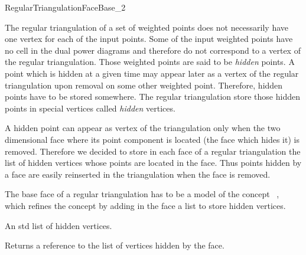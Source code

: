 

\begin{ccRefConcept}{RegularTriangulationFaceBase_2}


\ccDefinition
  
The regular triangulation of a set of weighted points does not
necessarily
have one vertex for each of the input points. Some of the input
weighted points have no cell in the dual power diagrams
and therefore do not correspond to a vertex of the regular
triangulation.
Those weighted points are said to be {\it hidden} points.
A  point which is hidden at a given time may appear later as a vertex of
the regular triangulation upon removal on some other weighted point.
Therefore, hidden points have to be stored somewhere.
The regular triangulation store those hidden points
in special vertices called {\it hidden} vertices.

A hidden point can appear as vertex of the triangulation
only when the
two dimensional face where its point component is located
(the face which hides it)
is removed. Therefore we decided to store 
in each  face of a regular triangulation
the list of hidden vertices whose points are located in the face.
Thus  points hidden by a face are easily reinserted in the triangulation
when the face is removed.

The base face of a regular triangulation 
has to be a model
of the concept \ccRefName\ , which refines
the concept  by adding
in the face  a list to store hidden vertices.

\ccRefines
{}

\ccTypes
{}
{An std list of hidden vertices.}




{Returns a reference to the list of vertices hidden by the face.}


\ccHasModels
{}

\ccSeeAlso
{} \\

\end{ccRefConcept}


